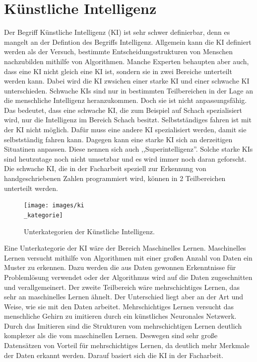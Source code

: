 \documentclass[11pt]{article}
\begin{document}
\section{Künstliche Intelligenz}
Der Begriff Künstliche Intelligenz (KI) ist sehr schwer definierbar, denn es mangelt an der Defintion des Begriffs Intelligenz.
Allgemein kann die KI definiert werden als der Versuch, bestimmte Entscheidungsstrukturen von Menschen nachzubilden mithilfe von
Algorithmen. Manche Experten behaupten aber auch, dass eine KI nicht gleich eine KI ist, sondern sie in zwei Bereiche unterteilt werden kann.
Dabei wird die KI zwsichen einer starke KI und einer schwache KI unterschieden. Schwache KIs sind nur in bestimmten Teilbereichen in der Lage
an die menschliche Intelligenz heranzukommen. Doch sie ist nicht anpassungsfähig. Das bedeutet, dass eine schwache KI, die zum Beispiel auf Schach
spezialisiert wird, nur die Intelligenz im Bereich Schach besitzt. Selbstständiges fahren ist mit der KI nicht möglich. Dafür muss eine
andere KI spezialisiert werden, damit sie selbstständig fahren kann. Dagegen kann eine starke KI sich an derzeitigen Situatinen anpassen. Diese nennen sich auch ,,Superintelligenz''.
Solche starke KIs sind heutzutage noch nicht umsetzbar und es wird immer noch daran geforscht.
Die schwache KI, die in der Facharbeit speziell zur Erkennung von handgeschriebenen Zahlen programmiert wird, können in 2 Teilbereichen
unterteilt werden.
\begin{figure}[h]
\centering
\texttt{[image: images/ki\\\_kategorie]}
\caption{Unterkategorien der Künstliche Intelligenz.}
\end{figure}
Eine Unterkategorie der KI wäre der Bereich Maschinelles Lernen. Maschinelles Lernen versucht mithilfe von Algorithmen mit einer großen Anzahl von
Daten ein Muster zu erkennen. Dazu werden die aus Daten gewonnen Erkenntnisse für Problemlösung verwendet oder der Algorithmus wird auf
die Daten zugeschnitten und verallgemeinert.
Der zweite Teilbereich wäre mehrschichtiges Lernen, das sehr an maschinelles Lernen ähnelt. Der Unterschied liegt aber an der Art und Weise, wie
sie mit den Daten arbeitet. Mehrschichtiges Lernen versucht das menschliche Gehirn zu imitieren durch ein künstliches Neuronales Netzwerk.
Durch das Imitieren sind die Strukturen vom mehrschichtigen Lernen deutlich komplexer als die vom maschinellen Lernen. Deswegen sind
sehr große Datensätzen von Vorteil für mehrschichtiges Lernen, da deutlich mehr Merkmale der Daten erkannt werden. Darauf basiert sich die KI
in der Facharbeit.
\end{document}
